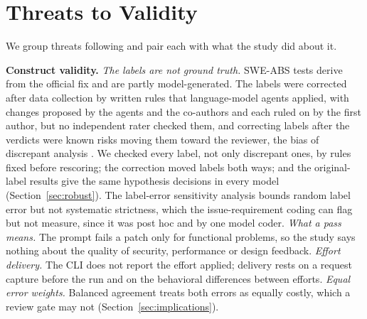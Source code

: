 \documentclass[sigconf,nonacm]{acmart}
\begin{document}
\section{Threats to Validity}\label{sec:threats}

We group threats following \citet{wohlin2012experimentation} and pair each with what the study did about it.

\textbf{Construct validity.} \textit{The labels are not ground truth.} SWE-ABS tests derive from the official fix and are partly model-generated. The labels were corrected after data collection by written rules that language-model agents applied, with changes proposed by the agents and the co-authors and each ruled on by the first author, but no independent rater checked them, and correcting labels after the verdicts were known risks moving them toward the reviewer, the bias of discrepant analysis \cite{hadgu1999discrepant}. We checked every label, not only discrepant ones, by rules fixed before rescoring; the correction moved labels both ways; and the original-label results give the same hypothesis decisions in every model (Section~\ref{sec:robust}). The label-error sensitivity analysis bounds random label error but not systematic strictness, which the issue-requirement coding can flag but not measure, since it was post hoc and by one model coder. \textit{What a pass means.} The prompt fails a patch only for functional problems, so the study says nothing about the quality of security, performance or design feedback. \textit{Effort delivery.} The CLI does not report the effort applied; delivery rests on a request capture before the run and on the behavioral differences between efforts. \textit{Equal error weights.} Balanced agreement treats both errors as equally costly, which a review gate may not (Section~\ref{sec:implications}).
\end{document}
